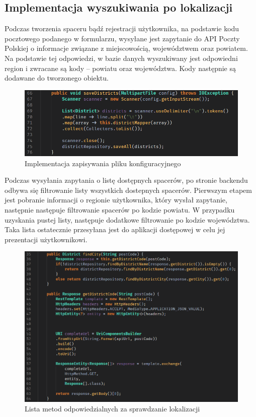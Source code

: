 \subsection{Implementacja wyszukiwania po lokalizacji}
Podczas tworzenia spaceru bądź rejestracji użytkownika, na podstawie kodu pocztowego podanego w formularzu, wysyłane jest zapytanie do API Poczty Polskiej o informacje związane z miejscowością, województwem oraz powiatem. Na podstawie tej odpowiedzi, w bazie danych wyszukiwany jest odpowiedni region i zwracane są kody -- powiatu oraz województwa. Kody następnie są dodawane do tworzonego obiektu.

\begin{figure}[H]
  \centering
  \includegraphics[width=1\linewidth]{rysunki/save.PNG}
  \caption{Implementacja zapisywania pliku konfiguracyjnego}
  \label{fig:config-file-implementation}
\end{figure}

Podczas wysyłania zapytania o listę dostępnych spacerów, po stronie backendu odbywa się filtrowanie listy wszystkich dostepnych spacerów. Pierwszym etapem jest pobranie informacji o regionie użytkownika, który wysłał zapytanie, następnie następuje filtrowanie spacerów po kodzie powiatu. W przypadku uzyskania pustej listy, następuje dodatkowe filtrowanie po kodzie województwa. Taka lista ostatecznie przesyłana jest do aplikacji dostępowej w celu jej prezentacji użytkownikowi.
\begin{figure}[H]
  \centering
  \includegraphics[width=1\linewidth]{rysunki/get-dist.PNG}
  \caption{Lista metod odpowiedzialnych za sprawdzanie lokalizacji}
  \label{fig:address-imlpementation}
\end{figure}

